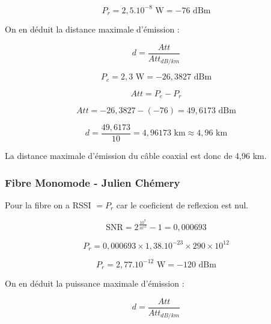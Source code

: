\documentclass[12]{article}
\begin{document}
\begin{equation*}
    P_r = 2,5.10^{-8} \text{ W} = -76 \text{ dBm}
\end{equation*}

On en déduit la distance maximale d'émission : 

\begin{equation*}
    d = \frac{Att}{Att_{dB/km}}
\end{equation*}

\begin{equation*}
    P_e = 2,3 \text{ W} = -26,3827 \text{ dBm}
\end{equation*}

\begin{equation*}
    Att = P_e - P_r
\end{equation*}
    
\begin{equation*}
    Att = -26,3827 - \left( -76 \right) = 49,6173 \text{ dBm}
\end{equation*}

\begin{equation*}
    d = \frac{49,6173}{10} = 4,96173 \text{ km} \approx 4,96 \text{ km}
\end{equation*}

La distance maximale d'émission du câble coaxial est donc de 4,96 km.


\subsubsection{Fibre Monomode - Julien Chémery}

Pour la fibre on a RSSI $= P_r$ car le coeficient de reflexion est nul.


\begin{equation*}
    \text{SNR} = 2^{ \frac{10^9}{10^{12}}} -1 = 0,000693
\end{equation*}

\begin{equation*}
    P_r = 0,000693 \times 1,38.10^{-23} \times 290 \times 10^{12}
\end{equation*}

\begin{equation*}
    P_r = 2,77.10^{-12} \text{ W} = -120 \text{ dBm}
\end{equation*}

On en déduit la puissance maximale d'émission : 

\begin{equation*}
    d = \frac{Att}{Att_{dB/km}}
\end{equation*}
\end{document}
